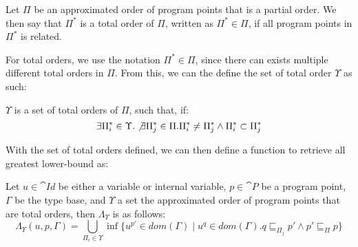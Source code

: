 \documentclass[../../master.tex]{subfiles}
\begin{document}
\begin{definition}
	Let $\Pi$ be an approximated order of program points that is a partial order.
	We then say that $\Pi^{*}$ is a total order of $\Pi$, written as $\Pi^{*}\in\Pi$, if all program points in $\Pi^{*}$ is related.
\end{definition}

For total orders, we use the notation $\Pi^{*}\in\Pi$, since there can exists multiple different total orders in $\Pi$.
From this, we can the define the set of total order $\Upsilon$ as such:

\begin{definition}[$\Upsilon$]
	$\Upsilon$ is a set of total orders of $\Pi$, such that, if:
	$$\exists \Pi^{*}_i\in\Upsilon.\not\exists\Pi^{*}_j\in\Pi.\Pi^{*}_i\neq\Pi^{*}_j\wedge\Pi^{*}_i\subset\Pi^{*}_j$$
\end{definition}

With the set of total orders defined, we can then define a function to retrieve all greatest lower-bound as:

\begin{definition}
	Let $u\in \cat{Id}$ be either a variable or internal variable, $p\in\cat{P}$ be a program point, $\Gamma$ be the type base, and $\Upsilon$ a set the approximated order of program points that are total orders, then $\Lambda_\Upsilon$ is as follows:
	$$\Lambda_\Upsilon(u,p,\Gamma)=\bigcup_{\Pi_i\in\Upsilon}\inf\{u^{p'}\in dom(\Gamma)\mid u^q\in dom(\Gamma).q\sqsubseteq_{\Pi_j} p'\wedge p'\sqsubseteq_\Pi p\}$$
\end{definition}
\fi
\end{document}
